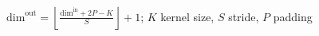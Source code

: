 $\text{dim}^{\text{out}} = \left \lfloor{\frac{\text{dim}^{\text{in}}+2P-K}{S}}\right \rfloor + 1$; $K$ kernel size, $S$ stride, $P$ padding
